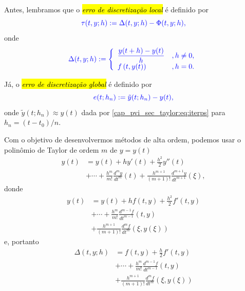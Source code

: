 Antes, lembramos que o \hl{\emph{erro de discretização local}} é definido por
\begin{equation}\label{cap_pvi_sec_taylor:eq:def_erro_local}\color{blue}\tau(t, y; h) := \Delta(t, y; h) - \Phi(t, y; h),
\end{equation}
onde
\begin{equation}\color{blue}\Delta(t, y; h) := \left\{
    \begin{array}{ll}
      \displaystyle\frac{y(t+h) - y(t)}{h} &, h\neq 0,\\
      f\left(t, y(t)\right) &, h=0.
    \end{array}
  \right.
\end{equation}

Já, o \hl{\emph{erro de discretização global}} é definido por
\begin{equation}\color{blue}e(t; h_n) := \tilde{y}(t; h_n) - y(t),
\end{equation}
onde $\tilde{y}(t; h_n) \approx y(t)$ dada por \eqref{cap_pvi_sec_taylor:eq:iterps} para $h_n = (t-t_0)/n$.

Com o objetivo de desenvolvermos métodos de alta ordem, podemos usar o polinômio de Taylor de ordem $m$ de $y=y(t)$
\begin{equation}
  \begin{aligned}
    y(t) &= y(t) + hy'(t) + \frac{h^2}{2}y''(t)\\
    &+ \cdots + \frac{h^m}{m!}\frac{d^m y}{d t^m}(t) + \frac{h^{m+1}}{(m+1)!}\frac{d^{m+1} y}{d t^{m+1}}(\xi),
  \end{aligned}
\end{equation}
donde
\begin{equation}\label{cap_pvi_sec_taylor:eq:y_poli_taylor}
  \begin{aligned}
    y(t) &= y(t) + hf(t, y) + \frac{h^2}{2}f'(t, y) \\
    &+ \cdots + \frac{h^m}{m!}\frac{d^{m-1} f}{d t^{m-1}}(t, y) \\
    & + \frac{h^{m+1}}{(m+1)!}\frac{d^{m} f}{d t^{m}}\left(\xi, y(\xi)\right)
  \end{aligned}
\end{equation}
e, portanto
\begin{equation}\label{cap_pvi_sec_taylor:eq:delta_taylor}
  \begin{aligned}
    \Delta(t, y; h) &= f(t, y) + \frac{h}{2}f'(t, y) \\
    &+ \cdots + \frac{h^m}{m!}\frac{d^{m-1} f}{d t^{m-1}}(t, y) \\
    & + \frac{h^{m+1}}{(m+1)!}\frac{d^{m} f}{d t^{m}}\left(\xi, y(\xi)\right)
  \end{aligned}  
\end{equation}

